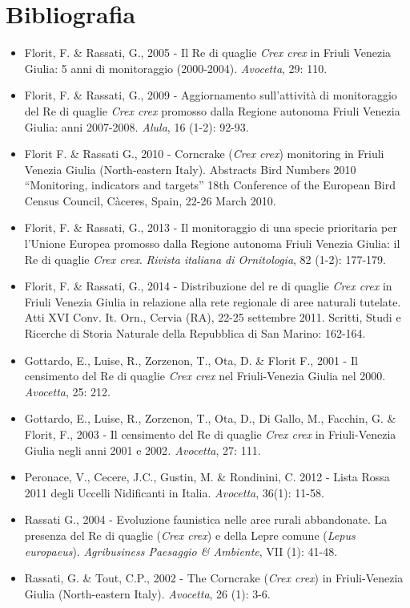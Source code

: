 \section*{Bibliografia}
\begin{itemize}\itemsep0pt
	\item Florit, F. \& Rassati, G., 2005 - Il Re di quaglie \textit{Crex crex }in Friuli Venezia Giulia: 5 anni di monitoraggio (2000-2004). \textit{Avocetta}, 29: 110.
	\item Florit, F. \& Rassati, G., 2009 - Aggiornamento sull{\textquoteright}attività di monitoraggio del Re di quaglie \textit{Crex crex }promosso dalla Regione autonoma Friuli Venezia Giulia: anni 2007-2008. \textit{Alula}, 16 (1-2): 92-93.
	\item Florit F. \& Rassati G., 2010 - Corncrake (\textit{Crex crex}) monitoring in Friuli Venezia Giulia (North-eastern Italy). Abstracts Bird Numbers 2010 “Monitoring, indicators and targets” 18th Conference of the European Bird Census Council, Càceres, Spain, 22-26 March 2010.
	\item Florit, F. \& Rassati, G., 2013 - Il monitoraggio di una specie prioritaria per l{\textquoteright}Unione Europea promosso dalla Regione autonoma Friuli Venezia Giulia: il Re di quaglie \textit{Crex crex}. \textit{Rivista italiana di Ornitologia}, 82 (1-2): 177-179.
	\item Florit, F. \& Rassati, G., 2014 - Distribuzione del re di quaglie \textit{Crex crex} in Friuli Venezia Giulia in relazione alla rete regionale di aree naturali tutelate. Atti XVI Conv. It. Orn., Cervia (RA), 22-25 settembre 2011. Scritti, Studi e Ricerche di Storia Naturale della Repubblica di San Marino: 162-164.
	\item Gottardo, E., Luise, R., Zorzenon, T., Ota, D. \& Florit F., 2001 - Il censimento del Re di quaglie \textit{Crex crex} nel Friuli-Venezia Giulia nel 2000. \textit{Avocetta}, 25: 212.
	\item Gottardo, E., Luise, R., Zorzenon, T., Ota, D., Di Gallo, M., Facchin, G. \& Florit, F., 2003 - Il censimento del Re di quaglie \textit{Crex crex }in Friuli-Venezia Giulia negli anni 2001 e 2002\textit{. Avocetta}, 27: 111.
	\item Peronace, V., Cecere, J.C., Gustin, M. \& Rondinini, C. 2012 - Lista Rossa 2011 degli Uccelli Nidificanti in Italia. \textit{Avocetta}, 36(1): 11-58.
	\item Rassati G., 2004 - Evoluzione faunistica nelle aree rurali abbandonate. La presenza del Re di quaglie (\textit{Crex crex}) e della Lepre comune (\textit{Lepus europaeus}). \textit{Agribusiness Paesaggio \& Ambiente}, VII (1): 41-48.
	\item Rassati, G. \& Tout, C.P., 2002 - The Corncrake (\textit{Crex crex}) in Friuli-Venezia Giulia (North-eastern Italy). \textit{Avocetta}, 26 (1): 3-6.
\end{itemize}